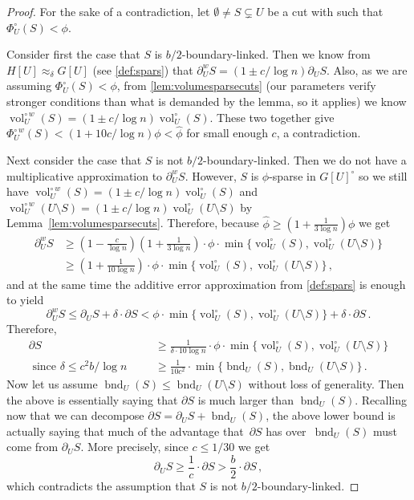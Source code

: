 \documentclass[epsfig,letter,11pt]{article}
\numberwithin{equation}{section}
\newcommand{\unbor}[2]{\operatorname{bnd}_{#2} (#1)}
\newcommand{\unvolc}[2]{\operatorname{vol}_{#2}^\circ (#1)}
\newcommand{\wvolc}[2]{\operatorname{vol}_{#2}^{\circ \,w} (#1)}
\newcommand{\unspc}[2]{\Phi_{#2}^\circ (#1)}
\newcommand{\wspc}[2]{\Phi_{#2}^{\circ \,w} (#1)}
\newcommand{\uncut}[2]{{\partial}_{#2} #1}
\newcommand{\uncutg}[1]{{\partial} #1}
\newcommand{\wcut}[2]{\partial^w_{#2} #1}
\renewcommand{\hat}{\widehat}
\begin{document}
\begin{proof}
	For the sake of a contradiction, let $\emptyset \neq S \subsetneq U$ be a cut with \smash{$\wspc{S}{U} \ge \hat{\phi}$} such that $\unspc{S}{U} < \phi$.
	
	Consider first the case that $S$ is $b/2$-boundary-linked. Then we know from $H[U] \approx_\delta G[U]$ (see \cref{def:spars}) that $\wcut{S}{U} = (1 \pm c/\log n) \uncut{S}{U}$. Also, as we are assuming $\unspc{S}{U} < \phi$, from \cref{lem:volumesparsecuts} (our parameters verify stronger conditions than what is demanded by the lemma, so it applies) we know $\wvolc{S}{U}= (1 \pm c/\log n)\unvolc{S}{U}$. These two together give $\wspc{S}{U} < (1+10c/\log n)\phi < \hat{\phi}$ for small enough $c$, a contradiction.
	
	Next consider the case that $S$ is not $b/2$-boundary-linked. Then we do not have a multiplicative approximation to $\wcut{S}{U}$. However, $S$ is $\phi$-sparse in $G[U]^\circ$ so we still have $\wvolc{S}{U}= (1 \pm c/\log n)\unvolc{S}{U}$ and $\wvolc{U \setminus S}{U}= (1 \pm c/\log n)\unvolc{U \setminus S}{U}$ by Lemma~\ref{lem:volumesparsecuts}. Therefore, because $\hat{\phi} \ge (1+\frac{1}{3\log n}) \phi$ we get
	\begin{align*}
		\wcut{S}{U} & \ge \left(1-\frac{c}{\log n}\right) \left(1+\frac{1}{3\log n}\right)\cdot \phi \cdot \min\{\unvolc{S}{U}, \unvolc{U \setminus S}{U}\} \\
		& \ge \left(1+\frac{1}{10\log n}\right)\cdot \phi \cdot \min\{\unvolc{S}{U}, \unvolc{U \setminus S}{U}\} \, ,
	\end{align*}
	and at the same time the additive error approximation from \cref{def:spars} is enough to yield
	\begin{equation*}
		\wcut{S}{U} \le \uncut{S}{U} + \delta \cdot \uncutg{S} < \phi \cdot \min\{\unvolc{S}{U}, \unvolc{U \setminus S}{U}\}  + \delta\cdot \uncutg{S} \, .
	\end{equation*}
	Therefore,
	\begin{align*}
		\uncutg{S} & \ge \frac{1}{\delta \cdot10 \log n} \cdot \phi \cdot \min\{\unvolc{S}{U}, \unvolc{U \setminus S}{U}\} \\
		\text{ since $\delta \le c^2 b/ \log n$ } \quad & \ge \frac{1}{10c^2} \cdot \min \{\unbor{S}{U}, \unbor{U \setminus S}{U}\}\, .
	\end{align*}
	Now let us assume $\unbor{S}{U} \le \unbor{U \setminus S}{U}$ without loss of generality. Then the above is essentially saying that $\uncutg{S}$ is much larger than $\unbor{S}{U}$.	Recalling now that we can decompose $\uncutg{S}=\uncut{S}{U}+\unbor{S}{U}$, the above lower bound is actually saying that much of the advantage that~$\uncutg{S}$ has over~$\unbor{S}{U}$ must come from $\uncut{S}{U}$. More precisely, since $c \le 1/30$ we get
	\begin{equation*}
		\uncut{S}{U} \ge\frac{1}{c} \cdot \uncutg{S} > \frac{b}{2} \cdot \uncutg{S} \, ,
	\end{equation*}
	which contradicts the assumption that $S$ is not $b/2$-boundary-linked.
\end{proof}
\end{document}
